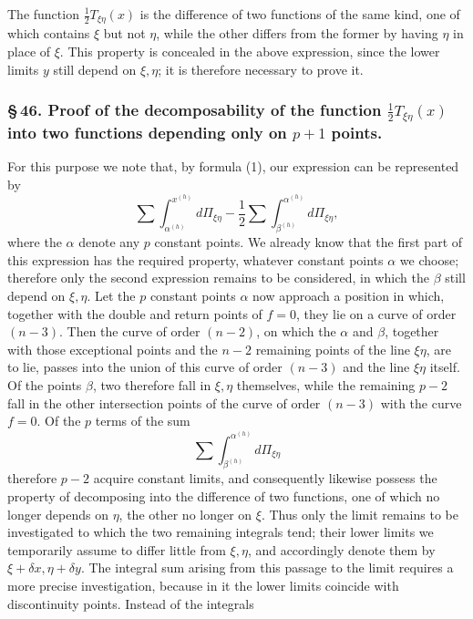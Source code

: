 \documentclass[10pt]{article}
\begin{document}
The function \(\frac12T_{\xi\eta}(x)\) is the difference of two functions of the same kind, one of which contains \(\xi\) but not \(\eta\), while the other differs from the former by having \(\eta\) in place of \(\xi\). This property is concealed in the above expression, since the lower limits \(y\) still depend on \(\xi,\eta\); it is therefore necessary to prove it.

\subsubsection*{\S\,46. Proof of the decomposability of the function \(\frac12T_{\xi\eta}(x)\) into two functions depending only on \(p+1\) points.}

For this purpose we note that, by formula (1), our expression can be represented by
\[
\sum\int_{\alpha^{(h)}}^{x^{(h)}}d\Pi_{\xi\eta}
-\frac12\sum\int_{\beta^{(h)}}^{\alpha^{(h)}}d\Pi_{\xi\eta},
\]
where the \(\alpha\) denote any \(p\) constant points. We already know that the first part of this expression has the required property, whatever constant points \(\alpha\) we choose; therefore only the second expression remains to be considered, in which the \(\beta\) still depend on \(\xi,\eta\). Let the \(p\) constant points \(\alpha\) now approach a position in which, together with the double and return points of \(f=0\), they lie on a curve of order \((n-3)\). Then the curve of order \((n-2)\), on which the \(\alpha\) and \(\beta\), together with those exceptional points and the \(n-2\) remaining points of the line \(\xi\eta\), are to lie, passes into the union of this curve of order \((n-3)\) and the line \(\xi\eta\) itself. Of the points \(\beta\), two therefore fall in \(\xi,\eta\) themselves, while the remaining \(p-2\) fall in the other intersection points of the curve of order \((n-3)\) with the curve \(f=0\). Of the \(p\) terms of the sum
\[
\sum\int_{\beta^{(h)}}^{\alpha^{(h)}}d\Pi_{\xi\eta}
\]
therefore \(p-2\) acquire constant limits, and consequently likewise possess the property of decomposing into the difference of two functions, one of which no longer depends on \(\eta\), the other no longer on \(\xi\). Thus only the limit remains to be investigated to which the two remaining integrals tend; their lower limits we temporarily assume to differ little from \(\xi,\eta\), and accordingly denote them by \(\xi+\delta x,\eta+\delta y\). The integral sum arising from this passage to the limit requires a more precise investigation, because in it the lower limits coincide with discontinuity points. Instead of the integrals
\end{document}
